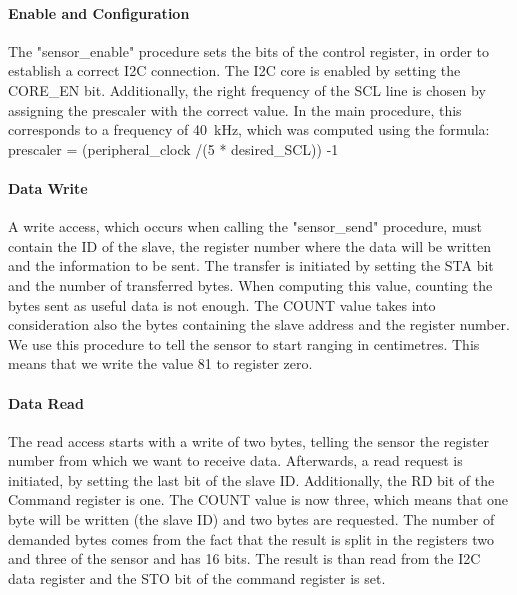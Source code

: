			\paragraph{Enable and Configuration} %
	   		\label{par:enable_task1}
   				The "sensor\_enable" procedure sets the bits of the control register, in order to establish a correct I2C connection. The I2C core is enabled by setting the CORE\_EN bit. Additionally, the right frequency of the SCL line is chosen by assigning the prescaler with the correct value. In the main procedure, this corresponds to a frequency of \SI{40}{\kilo\hertz}, which was computed using the formula:  prescaler = (peripheral\_clock /(5 * desired\_SCL)) -1
				
			\paragraph{Data Write} %
	   		\label{par:data_write_task1}
	   			A write access, which occurs when calling the "sensor\_send" procedure, must contain the ID of the slave, the register number where the data will be written and the information to be sent. The transfer is initiated by setting the STA bit and the number of transferred bytes. When computing this value, counting the bytes sent as useful data is not enough. The COUNT value takes into consideration also the bytes containing the slave address and the register number.
				We use this procedure to tell the sensor to start ranging in centimetres. This means that we write the value \num{81} to register zero.
			
			\paragraph{Data Read} %
	   		\label{par:data_read_task1}
	   			The read access starts with a write of two bytes, telling the sensor the register number from which we want to receive data. Afterwards, a read request is initiated, by setting the last bit of the slave ID. Additionally, the RD bit of the Command register is one. The COUNT value is now three, which means that one byte will be written (the slave ID) and two bytes are requested. The number of demanded bytes comes from the fact that the result is split in the registers two and three of the sensor and has \num{16} bits. The result is than read from the I2C data register and the STO bit of the command register is set.
			
